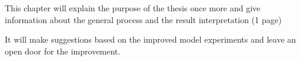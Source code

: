 
\begingroup

This chapter will explain the purpose of the thesis once more and give information about the general
process and the result interpretation (1 page)

It will make suggestions based on the improved model experiments and leave an open door for the improvement.

\endgroup